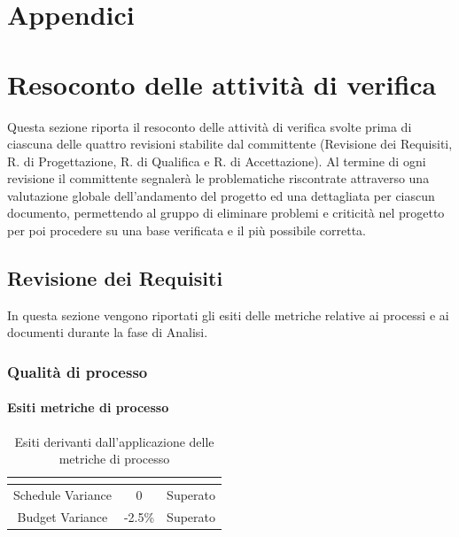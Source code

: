 \appendix
{}
\section*{Appendici}
\section{Resoconto delle attività di verifica}
Questa sezione riporta il resoconto delle attività di verifica svolte prima di ciascuna delle quattro revisioni stabilite dal committente (Revisione dei Requisiti, R. di Progettazione, R. di Qualifica e R. di Accettazione).
Al termine di ogni revisione il committente segnalerà le problematiche riscontrate attraverso una valutazione globale dell'andamento del progetto ed una dettagliata per ciascun documento, permettendo al gruppo di eliminare problemi e criticità nel progetto per poi procedere su una base verificata e il più possibile corretta.

\subsection{Revisione dei Requisiti}
In questa sezione vengono riportati gli esiti delle metriche relative ai processi e ai documenti durante la fase di Analisi.
\subsubsection{Qualità di processo}
\paragraph{Esiti metriche di processo} \MiniSpazio
\renewcommand{\arraystretch}{1.5}
\begin{table}[H]
	\begin{center}
		\begin{tabular}{|c|c|c|}
			\hline
			\rowcolor{title_row}
			\textbf{\color{title_text}{Metrica}} & \textbf{\color{title_text}{Valore ottenuto}} & \textbf{\color{title_text}{Esito}} \\
			\hline
			{Schedule Variance} & {0} & {Superato}\\	
			\hline
			{Budget Variance} & {-2.5\%} & {Superato}\\	
			\hline
		\end{tabular}
	\caption[Esiti metriche di processo, Analisi]{Esiti derivanti dall'applicazione delle metriche di processo}	
	\label{tabella: esiti derivanti dall'applicazione delle metriche di processo}
	\end{center}
\end{table}
\renewcommand{\arraystretch}{1}
